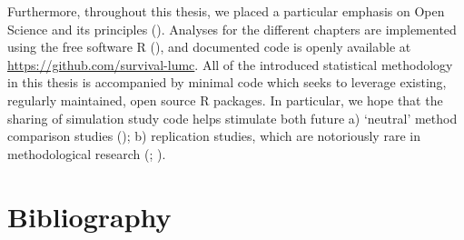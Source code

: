 \documentclass[
  letterpaper,
  paper=240mm:170mm,
  twoside=true,
  open=right,
  fontsize=10pt,
  pagesize=false,
  BCOR=15mm,
  DIV=14,
  headinclude=true,
  footinclude=false,
  headsepline=on]{scrbook}
\begin{document}
Furthermore, throughout this thesis, we placed a particular emphasis on
Open Science and its principles
(). Analyses for the different chapters are
implemented using the free software R
(), and documented code is openly available at
\url{https://github.com/survival-lumc}. All of the introduced
statistical methodology in this thesis is accompanied by minimal code
which seeks to leverage existing, regularly maintained, open source R
packages. In particular, we hope that the sharing of simulation study
code helps stimulate both future a) `neutral' method comparison studies
(); b) replication studies, which are notoriously rare in
methodological research
(; ).


\chapter*{Bibliography}\label{bibliography}


\end{document}
